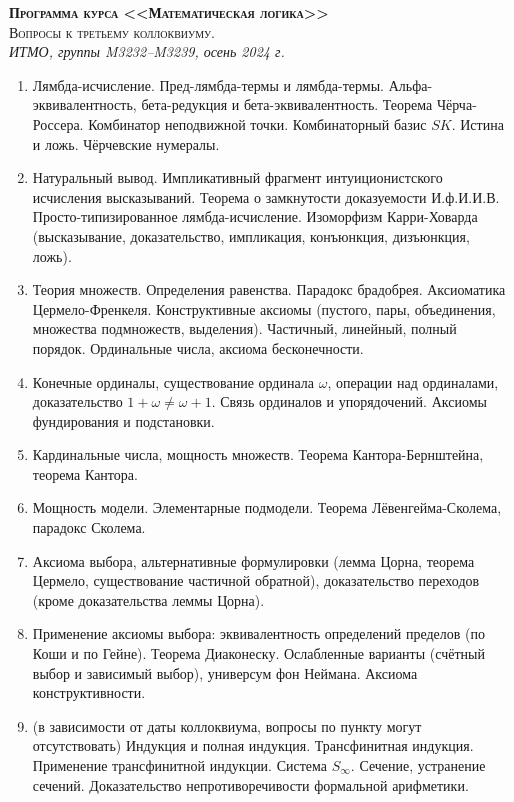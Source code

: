 \documentclass[11pt,a4paper,oneside]{scrartcl}
\begin{document}
\pagestyle{empty}

\begin{center}
{\large\scshape\bfseries Программа курса <<Математическая логика>>}\\
{\large\scshape Вопросы к третьему коллоквиуму.}\\
\itshape ИТМО, группы M3232--M3239, осень 2024 г.
\end{center}


\begin{enumerate}
\item Лямбда-исчисление. Пред-лямбда-термы и лямбда-термы. Альфа-эквивалентность, бета-редукция
и бета-эквивалентность. Теорема Чёрча-Россера. 
Комбинатор неподвижной точки. Комбинаторный базис $SK$.
Истина и ложь. Чёрчевские нумералы. 
\item Натуральный вывод. Импликативный фрагмент интуиционистского исчисления высказываний.
Теорема о замкнутости доказуемости И.ф.И.И.В.
Просто-типизированное лямбда-исчисление. Изоморфизм Карри-Ховарда 
(высказывание, доказательство, импликация, конъюнкция, дизъюнкция, ложь). 
\item Теория множеств. Определения равенства. Парадокс брадобрея. Аксиоматика Цермело-Френкеля. 
Конструктивные аксиомы
(пустого, пары, объединения, множества подмножеств, выделения).
Частичный, линейный, полный порядок. Ординальные числа, аксиома бесконечности. 
\item Конечные ординалы, существование ординала $\omega$, операции над ординалами, 
доказательство $1+\omega\ne\omega+1$. Связь ординалов и упорядочений. Аксиомы фундирования и подстановки.
\item Кардинальные числа, мощность множеств. Теорема Кантора-Бернштейна, теорема Кантора. 
\item Мощность модели. Элементарные подмодели. Теорема Лёвенгейма-Сколема, парадокс Сколема.
\item Аксиома выбора, альтернативные формулировки (лемма Цорна, теорема Цермело, существование
частичной обратной), доказательство переходов (кроме доказательства леммы Цорна).
\item Применение аксиомы выбора: эквивалентность определений пределов (по Коши и по Гейне).
Теорема Диаконеску. Ослабленные варианты (счётный выбор и зависимый выбор), универсум фон Неймана.
Аксиома конструктивности.
\item 
(в зависимости от даты коллоквиума, вопросы по пункту могут отсутствовать)
Индукция и полная индукция. Трансфинитная индукция. Применение трансфинитной индукции.
Система $S_\infty$. 
Сечение, устранение сечений. Доказательство непротиворечивости формальной арифметики.
\end{enumerate}
\end{document}
